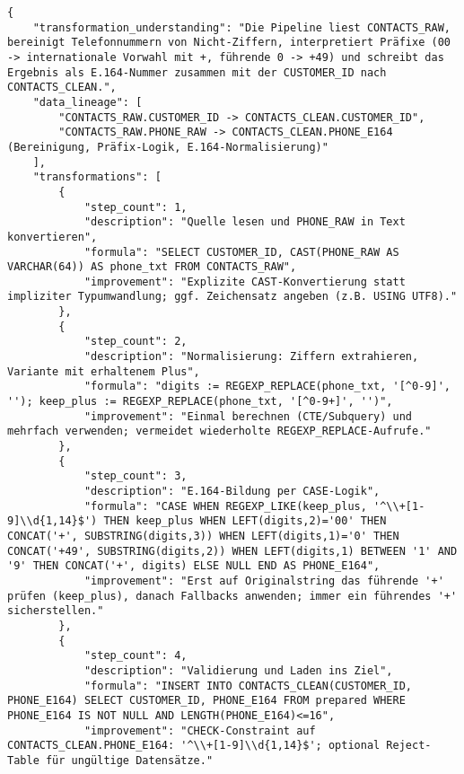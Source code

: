 \begin{lstlisting}[caption={Ausgabe: GPT-5 Anwendungsfall 3 Robustheitsdurchlauf},label={gpt_case3_prompt3}]
{
    "transformation_understanding": "Die Pipeline liest CONTACTS_RAW, bereinigt Telefonnummern von Nicht-Ziffern, interpretiert Präfixe (00 -> internationale Vorwahl mit +, führende 0 -> +49) und schreibt das Ergebnis als E.164-Nummer zusammen mit der CUSTOMER_ID nach CONTACTS_CLEAN.",
    "data_lineage": [
        "CONTACTS_RAW.CUSTOMER_ID -> CONTACTS_CLEAN.CUSTOMER_ID",
        "CONTACTS_RAW.PHONE_RAW -> CONTACTS_CLEAN.PHONE_E164 (Bereinigung, Präfix-Logik, E.164-Normalisierung)"
    ],
    "transformations": [
        {
            "step_count": 1,
            "description": "Quelle lesen und PHONE_RAW in Text konvertieren",
            "formula": "SELECT CUSTOMER_ID, CAST(PHONE_RAW AS VARCHAR(64)) AS phone_txt FROM CONTACTS_RAW",
            "improvement": "Explizite CAST-Konvertierung statt impliziter Typumwandlung; ggf. Zeichensatz angeben (z.B. USING UTF8)."
        },
        {
            "step_count": 2,
            "description": "Normalisierung: Ziffern extrahieren, Variante mit erhaltenem Plus",
            "formula": "digits := REGEXP_REPLACE(phone_txt, '[^0-9]', ''); keep_plus := REGEXP_REPLACE(phone_txt, '[^0-9+]', '')",
            "improvement": "Einmal berechnen (CTE/Subquery) und mehrfach verwenden; vermeidet wiederholte REGEXP_REPLACE-Aufrufe."
        },
        {
            "step_count": 3,
            "description": "E.164-Bildung per CASE-Logik",
            "formula": "CASE WHEN REGEXP_LIKE(keep_plus, '^\\+[1-9]\\d{1,14}$') THEN keep_plus WHEN LEFT(digits,2)='00' THEN CONCAT('+', SUBSTRING(digits,3)) WHEN LEFT(digits,1)='0' THEN CONCAT('+49', SUBSTRING(digits,2)) WHEN LEFT(digits,1) BETWEEN '1' AND '9' THEN CONCAT('+', digits) ELSE NULL END AS PHONE_E164",
            "improvement": "Erst auf Originalstring das führende '+' prüfen (keep_plus), danach Fallbacks anwenden; immer ein führendes '+' sicherstellen."
        },
        {
            "step_count": 4,
            "description": "Validierung und Laden ins Ziel",
            "formula": "INSERT INTO CONTACTS_CLEAN(CUSTOMER_ID, PHONE_E164) SELECT CUSTOMER_ID, PHONE_E164 FROM prepared WHERE PHONE_E164 IS NOT NULL AND LENGTH(PHONE_E164)<=16",
            "improvement": "CHECK-Constraint auf CONTACTS_CLEAN.PHONE_E164: '^\\+[1-9]\\d{1,14}$'; optional Reject-Table für ungültige Datensätze."

\end{lstlisting}
